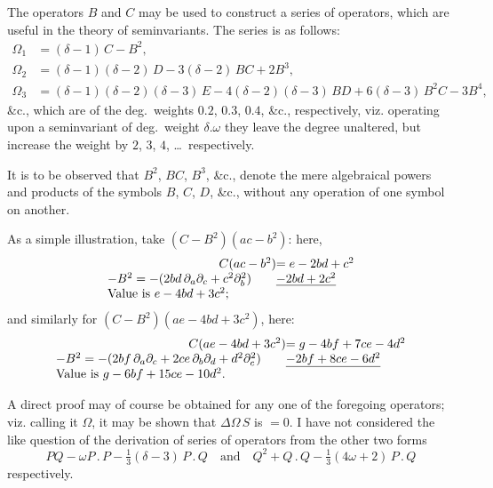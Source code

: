 \documentclass[11pt,a4paper]{book}
\begin{document}
{{{\setcounter{art}{77}
\begin{art}
The operators $B$ and $C$ may be used to construct a series of operators, which are useful in the theory of seminvariants. The series is as follows:
\begin{align*}
\Omega_{1} &= (\delta - 1)\,C - B^{2},\\
\Omega_{2} &= (\delta - 1)(\delta - 2)\,D - 3(\delta - 2)\,BC + 2B^{3},\\
\Omega_{3} &= (\delta - 1)(\delta - 2)(\delta - 3)\,E - 4(\delta - 2)(\delta - 3)\,BD + 6(\delta - 3)\,B^{2}C - 3B^{4},
\end{align*}
\&c., which are of the deg.~weights $0.2$, $0.3$, $0.4$, \&c., respectively, viz. operating upon a seminvariant of deg.~weight $\delta.\omega$ they leave the degree unaltered, but increase the weight by $2$, $3$, $4$, \ldots\ respectively.
\end{art}

\setcounter{art}{78}
\begin{art}
It is to be observed that $B^{2}$, $BC$, $B^{3}$, \&c., denote the mere algebraical powers and products of the symbols $B$, $C$, $D$, \&c., without any operation of one symbol on another.
\end{art}

\setcounter{art}{79}
\begin{art}
As a simple illustration, take $(C - B^{2})(ac - b^{2})$: here,
\[
\begin{array}{r@{}l}
C(ac - b^{2}) &= e - 2bd + c^{2} \\
-B^{2} = -(2bd\,\partial_{a}\partial_{c} + c^{2}\partial_{b}^{2})\qquad & \underline{-2bd + 2c^{2}} \\
\multicolumn{2}{l}{\text{Value is } e - 4bd + 3c^{2};}
\end{array}
\]
and similarly for $(C - B^{2})(ae - 4bd + 3c^{2})$, here:
\[
\begin{array}{r@{}l}
C(ae - 4bd + 3c^{2}) &= g - 4bf + 7ce - 4d^{2} \\
-B^{2} = -(2bf\,\partial_{a}\partial_{c} + 2ce\,\partial_{b}\partial_{d} + d^{2}\partial_{c}^{2})\qquad & \underline{-2bf + 8ce - 6d^{2}} \\
\multicolumn{2}{l}{\text{Value is } g - 6bf + 15ce - 10d^{2}.}
\end{array}
\]
\end{art}

\setcounter{art}{80}
\begin{art}
A direct proof may of course be obtained for any one of the foregoing operators; viz. calling it $\Omega$, it may be shown that $\Delta\Omega\,S$ is $= 0$. I have not considered the like question of the derivation of series of operators from the other two forms
\[
PQ - \omega P\,.\,P - \tfrac{1}{3}(\delta - 3)\,P\,.\,Q \quad \text{and} \quad Q^{2} + Q\,.\,Q - \tfrac{1}{3}(4\omega + 2)\,P\,.\,Q
\]
respectively.
\end{art}

}}}
\end{document}

